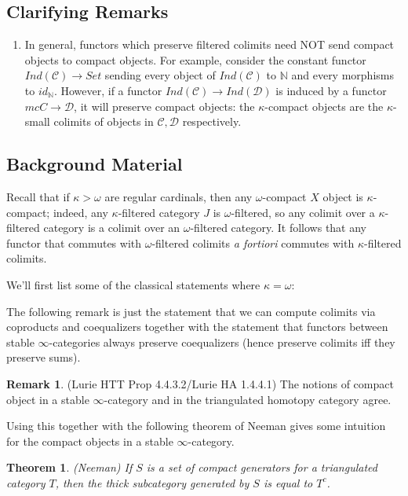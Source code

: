 \documentclass[letterpaper]{article}
\newtheorem{theorem}{Theorem}
\theoremstyle{definition}
\newtheorem{remark}[lemma]{Remark}
\newcommand{\mbb}{\mathbb}
\newcommand{\mc}{\mathcal}
\begin{document}
\subsection{Clarifying Remarks}

\begin{enumerate}
\item In general, functors which preserve filtered colimits need NOT
  send compact objects to compact objects. For example, consider the
  constant functor $Ind(\mc C) \rightarrow Set$ sending every object of
  $Ind(\mc C)$ to $\mbb N$ and every morphisms to $id_{\mbb
    N}$. However, if a functor $Ind(\mc C) \rightarrow Ind(\mc D)$ is
  induced by a functor $mc C \rightarrow \mc D$, it will preserve
  compact objects: the $\kappa$-compact objects are the $\kappa$-small
  colimits of objects in $\mc C,\mc D$ respectively.
\end{enumerate}
\subsection{Background Material}


Recall that if $\kappa > \omega$ are regular cardinals, then any
  $\omega$-compact $X$ object is $\kappa$-compact; indeed, any
  $\kappa$-filtered category $J$ is $\omega$-filtered, so any colimit over
  a $\kappa$-filtered category is a colimit over an $\omega$-filtered
  category. It follows that any functor that commutes with
  $\omega$-filtered colimits \textit{a fortiori} commutes with
  $\kappa$-filtered colimits.


We'll first list some of the classical statements where $\kappa = \omega$:

The following remark is just the statement that we can compute
colimits via coproducts and coequalizers together with the statement
that functors between stable $\infty$-categories always preserve
coequalizers (hence preserve colimits iff they preserve sums).


\begin{remark} (Lurie HTT Prop 4.4.3.2/Lurie HA 1.4.4.1)
The notions of compact object in a stable $\infty$-category and in the
triangulated homotopy category agree.
\end{remark}

Using this together with the following theorem of Neeman gives some
intuition for the compact objects in a stable $\infty$-category.

\begin{theorem} (Neeman)
If $S$ is a set of compact generators for a triangulated category $T$,
then the thick subcategory generated by $S$ is equal to $T^c$.
\end{theorem}
\end{document}
